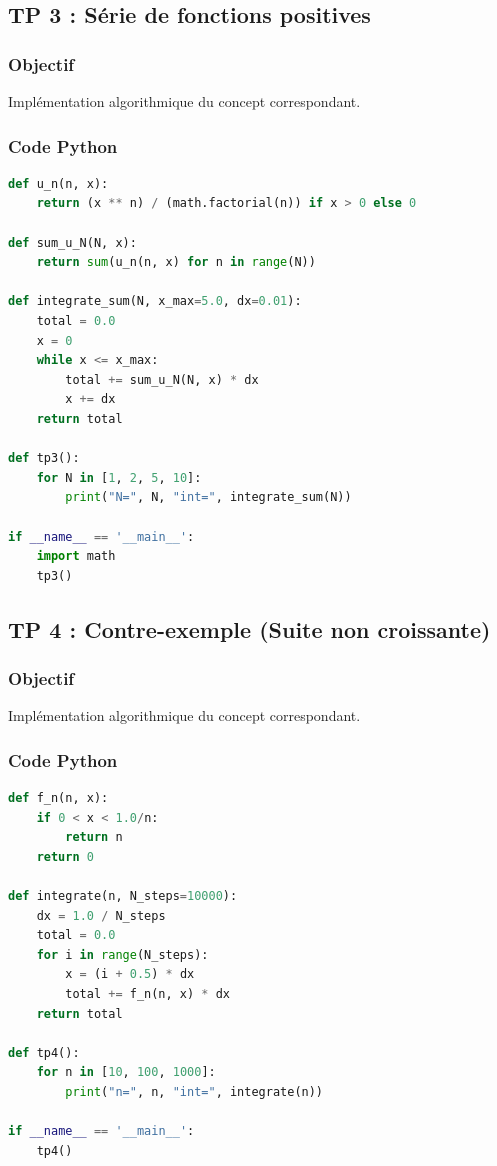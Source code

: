 \documentclass[11pt,a4paper]{article}
\begin{document}
\subsection*{TP 3 : Série de fonctions positives}

\subsubsection*{Objectif}
Implémentation algorithmique du concept correspondant.

\subsubsection*{Code Python}
\begin{lstlisting}[language=python]
def u_n(n, x):
    return (x ** n) / (math.factorial(n)) if x > 0 else 0

def sum_u_N(N, x):
    return sum(u_n(n, x) for n in range(N))

def integrate_sum(N, x_max=5.0, dx=0.01):
    total = 0.0
    x = 0
    while x <= x_max:
        total += sum_u_N(N, x) * dx
        x += dx
    return total

def tp3():
    for N in [1, 2, 5, 10]:
        print("N=", N, "int=", integrate_sum(N))

if __name__ == '__main__':
    import math
    tp3()
\end{lstlisting}


\subsection*{TP 4 : Contre-exemple (Suite non croissante)}

\subsubsection*{Objectif}
Implémentation algorithmique du concept correspondant.

\subsubsection*{Code Python}
\begin{lstlisting}[language=python]
def f_n(n, x):
    if 0 < x < 1.0/n:
        return n
    return 0

def integrate(n, N_steps=10000):
    dx = 1.0 / N_steps
    total = 0.0
    for i in range(N_steps):
        x = (i + 0.5) * dx
        total += f_n(n, x) * dx
    return total

def tp4():
    for n in [10, 100, 1000]:
        print("n=", n, "int=", integrate(n))

if __name__ == '__main__':
    tp4()
\end{lstlisting}
\end{document}
